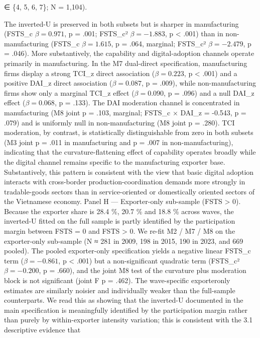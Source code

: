 \documentclass[12pt,a4paper]{article}
\begin{document}
∈ \{4, 5, 6, 7\}; N = 1,104).

The inverted-U is preserved in both subsets but is sharper in
manufacturing (FSTS\_c \(\beta = 0.971\), p = .001; FSTS\_c²
\(\beta = -1.883\), p \textless{} .001) than in non-manufacturing
(FSTS\_c \(\beta = 1.615\), p = .064, marginal; FSTS\_c²
\(\beta = -2.479\), p = .046). More substantively, the capability and
digital-adoption channels operate primarily in manufacturing. In the M7
dual-direct specification, manufacturing firms display a strong TCI\_z
direct association (\(\beta = 0.223\), p \textless{} .001) and a
positive DAI\_z direct association (\(\beta = 0.087\), p = .009), while
non-manufacturing firms show only a marginal TCI\_z effect
(\(\beta = 0.090\), p = .096) and a null DAI\_z effect
(\(\beta = 0.068\), p = .133). The DAI moderation channel is
concentrated in manufacturing (M8 joint p = .103, marginal; FSTS\_c ×
DAI\_z = -0.543, p = .079) and is uniformly null in non-manufacturing
(M8 joint p = .280). TCI moderation, by contrast, is statistically
distinguishable from zero in both subsets (M3 joint p = .011 in
manufacturing and p = .007 in non-manufacturing), indicating that the
curvature-flattening effect of capability operates broadly while the
digital channel remains specific to the manufacturing exporter base.
Substantively, this pattern is consistent with the view that basic
digital adoption interacts with cross-border production-coordination
demands more strongly in tradable-goods sectors than in service-oriented
or domestically oriented sectors of the Vietnamese economy. Panel H ---
Exporter-only sub-sample (FSTS \textgreater{} 0). Because the exporter
share is 28.4 \%, 20.7 \% and 18.8 \% across waves, the inverted-U
fitted on the full sample is partly identified by the participation
margin between FSTS = 0 and FSTS \textgreater{} 0. We re-fit M2 / M7 /
M8 on the exporter-only sub-sample (N ≈ 281 in 2009, 198 in 2015, 190 in
2023, and 669 pooled). The pooled exporter-only specification yields a
negative linear FSTS\_c term (\(\beta = -0.861\), p \textless{} .001)
but a non-significant quadratic term (FSTS\_c² \(\beta = -0.200\), p =
.660), and the joint M8 test of the curvature plus moderation block is
not significant (joint F p = .462). The wave-specific exporteronly
estimates are similarly noisier and individually weaker than the
full-sample counterparts. We read this as showing that the inverted-U
documented in the main specification is meaningfully identified by the
participation margin rather than purely by within-exporter intensity
variation; this is consistent with the 3.1 descriptive evidence that
\end{document}

